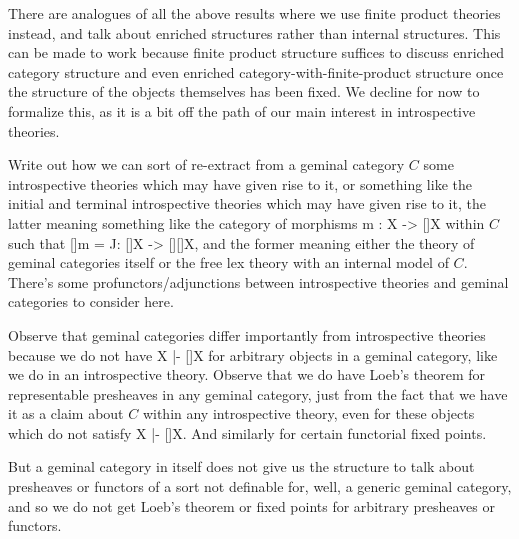 There are analogues of all the above results where we use finite product theories instead, and talk about enriched structures rather than internal structures. This can be made to work because finite product structure suffices to discuss enriched category structure and even enriched category-with-finite-product structure once the structure of the objects themselves has been fixed. We decline for now to formalize this, as it is a bit off the path of our main interest in introspective theories. 

\begin{TODOblock}
Write out how we can sort of re-extract from a geminal category $C$ some introspective theories which may have given rise to it, or something like the initial and terminal introspective theories which may have given rise to it, the latter meaning something like the category of morphisms m : X -> []X within $C$ such that []m = J: []X -> [][]X, and the former meaning either the theory of geminal categories itself or the free lex theory with an internal model of $C$. There's some profunctors/adjunctions between introspective theories and geminal categories to consider here.
\end{TODOblock}

\begin{TODOblock}
Observe that geminal categories differ importantly from introspective theories because we do not have X |- []X for arbitrary objects in a geminal category, like we do in an introspective theory. Observe that we do have Loeb's theorem for representable presheaves in any geminal category, just from the fact that we have it as a claim about $C$ within any introspective theory, even for these objects which do not satisfy X |- []X. And similarly for certain functorial fixed points.

But a geminal category in itself does not give us the structure to talk about presheaves or functors of a sort not definable for, well, a generic geminal category, and so we do not get Loeb's theorem or fixed points for arbitrary presheaves or functors.
\end{TODOblock}